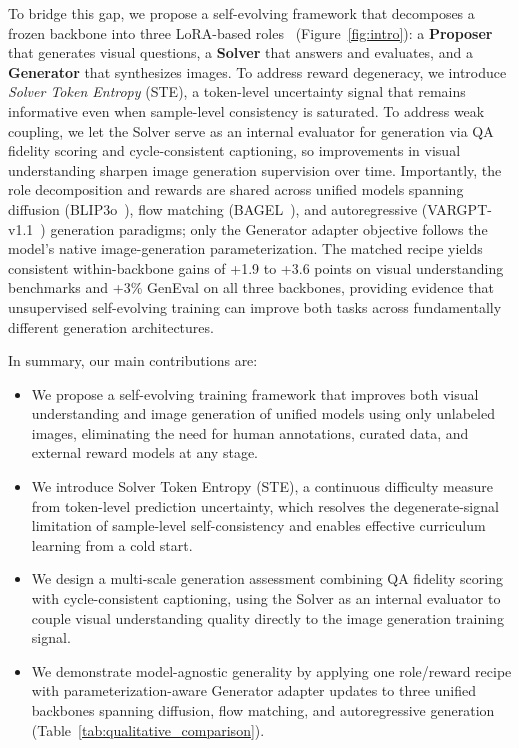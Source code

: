 To bridge this gap, we propose a self-evolving framework that decomposes a frozen backbone into three LoRA-based roles~\citep{hu2022lora} (Figure~\ref{fig:intro}): a \textbf{Proposer} that generates visual questions, a \textbf{Solver} that answers and evaluates, and a \textbf{Generator} that synthesizes images. To address reward degeneracy, we introduce \emph{Solver Token Entropy} (STE), a token-level uncertainty signal that remains informative even when sample-level consistency is saturated. To address weak coupling, we let the Solver serve as an internal evaluator for generation via QA fidelity scoring and cycle-consistent captioning, so improvements in visual understanding sharpen image generation supervision over time. Importantly, the role decomposition and rewards are shared across unified models spanning diffusion (BLIP3o~\citep{chen2025blip3o}), flow matching (BAGEL~\citep{deng2025bagel}), and autoregressive (VARGPT-v1.1~\citep{zhuang2025vargpt}) generation paradigms; only the Generator adapter objective follows the model's native image-generation parameterization. The matched recipe yields consistent within-backbone gains of +1.9 to +3.6 points on visual understanding benchmarks and +3\% GenEval on all three backbones, providing evidence that unsupervised self-evolving training can improve both tasks across fundamentally different generation architectures.

In summary, our main contributions are:
\begin{itemize}
    \item We propose a self-evolving training framework that improves both visual understanding and image generation of unified models using only unlabeled images, eliminating the need for human annotations, curated data, and external reward models at any stage.
    \item We introduce Solver Token Entropy (STE), a continuous difficulty measure from token-level prediction uncertainty, which resolves the degenerate-signal limitation of sample-level self-consistency and enables effective curriculum learning from a cold start.
    \item We design a multi-scale generation assessment combining QA fidelity scoring with cycle-consistent captioning, using the Solver as an internal evaluator to couple visual understanding quality directly to the image generation training signal.
    \item We demonstrate model-agnostic generality by applying one role/reward recipe with parameterization-aware Generator adapter updates to three unified backbones spanning diffusion, flow matching, and autoregressive generation (Table~\ref{tab:qualitative_comparison}).
\end{itemize}

